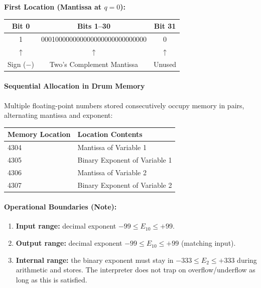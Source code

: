 \vspace{1em}
\noindent\textbf{First Location (Mantissa at $q = 0$):}
\begin{table}[h]
\centering
\small
\ttfamily
\begin{tabular}{|c|c|c|}
\hline
\textbf{Bit 0} & \textbf{Bits 1--30} & \textbf{Bit 31} \\ \hline
1 & 000100000000000000000000000000 & 0 \\ \hline
\multicolumn{1}{c}{$\uparrow$} & \multicolumn{1}{c}{$\uparrow$} & \multicolumn{1}{c}{$\uparrow$} \\
\multicolumn{1}{c}{\small Sign ($-$)} & \multicolumn{1}{c}{\small Two's Complement Mantissa} & \multicolumn{1}{c}{\small Unused} \\
\end{tabular}
\end{table}
\paragraph{Sequential Allocation in Drum Memory}
Multiple floating-point numbers stored consecutively occupy memory in pairs, alternating mantissa and exponent:

\begin{table}[h]
\centering
\small
\ttfamily
\begin{tabular}{ll}
\toprule
\textbf{Memory Location} & \textbf{Location Contents} \\ 
\midrule
4304 & Mantissa of Variable 1 \\
4305 & Binary Exponent of Variable 1 \\
4306 & Mantissa of Variable 2 \\
4307 & Binary Exponent of Variable 2 \\
\bottomrule
\end{tabular}
\end{table}

\paragraph{Operational Boundaries (Note):}
\begin{enumerate}
    \item \textbf{Input range:} decimal exponent $-99 \le E_{10} \le +99$.
    \item \textbf{Output range:} decimal exponent $-99 \le E_{10} \le +99$ (matching input).
    \item \textbf{Internal range:} the binary exponent must stay in $-333 \le E_2 \le +333$ during arithmetic and stores. The interpreter does not trap on overflow/underflow as long as this is satisfied.
\end{enumerate}

